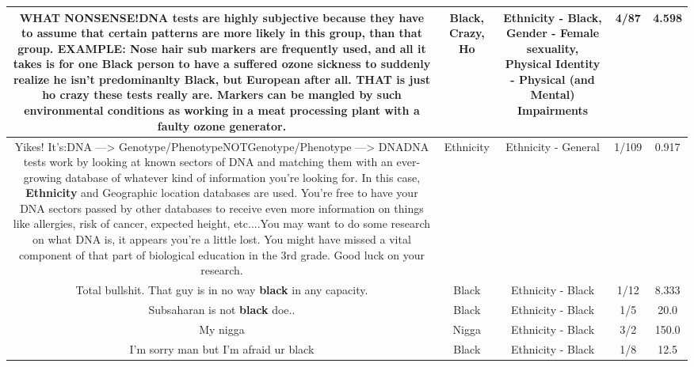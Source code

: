 \documentclass[11pt]{article}
\newlength\mylength
\begin{document}
\begin{center}
\begin{longtable}{|C{.65\mylength}|C{.30\mylength}|C{.12\mylength}|C{.12\mylength}|C{.12\mylength}|}
  \small WHAT NONSENSE!DNA tests are highly subjective because they have to assume that certain patterns are more likely in this group, than that group. EXAMPLE: Nose hair sub markers are frequently used, and all it takes is for one \textbf{Black} person to have a suffered ozone sickness to suddenly realize he isn't predominanlty \textbf{Black}, but European after all. THAT is just \textbf{ho} \textbf{crazy} these tests really are. Markers can be mangled by such environmental conditions as working in a meat processing plant with a faulty ozone generator.\normalsize   & Black, Crazy, Ho & Ethnicity - Black, Gender - Female sexuality, Physical Identity - Physical (and Mental) Impairments & 4/87 & 4.598 \\  \hline
  \small Yikes! It's:DNA ---> Genotype/PhenotypeNOTGenotype/Phenotype ---> DNADNA tests work by looking at known sectors of DNA and matching them with an ever-growing database of whatever kind of information you're looking for. In this case, \textbf{Ethnicity} and Geographic location databases are used. You're free to have your DNA sectors passed by other databases to receive even more information on things like allergies, risk of cancer, expected height, etc....You may want to do some research on what DNA is, it appears you're a little lost. You might have missed a vital component of that part of biological education in the 3rd grade. Good luck on your research.\normalsize   & Ethnicity & Ethnicity - General & 1/109 & 0.917 \\  \hline
  \small Total bullshit. That guy is in no way \textbf{black} in any capacity.\normalsize   & Black & Ethnicity - Black & 1/12 & 8.333 \\  \hline
  \small Subsaharan is not \textbf{black} doe..\normalsize   & Black & Ethnicity - Black & 1/5 & 20.0 \\  \hline
  \small My nigga\normalsize   & Nigga & Ethnicity - Black & 3/2 & 150.0 \\  \hline
  \small I'm sorry man but I'm afraid ur black\normalsize   & Black & Ethnicity - Black & 1/8 & 12.5 \\  \hline

\end{longtable}
\end{center}
\end{document}
